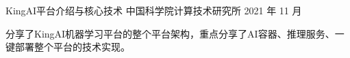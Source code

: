 

\begin{cventries}

    \cventry
    {}
    {KingAI平台介绍与核心技术}
    {中国科学院计算技术研究所}
    {2021 年 11 月}
    {
      \begin{cvitems} %
        \item {
          分享了KingAI机器学习平台的整个平台架构，重点分享了AI容器、推理服务、一键部署整个平台的技术实现。
          }
        \end{cvitems}
    }
  
\end{cventries}






